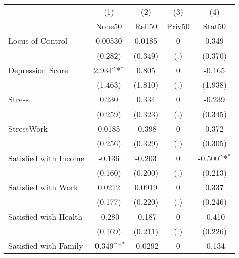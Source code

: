 {
\def\sym#1{\ifmmode^{#1}\else\(^{#1}\)\fi}
\begin{tabular}{l*{4}{c}}
\hline\hline
            &\multicolumn{1}{c}{(1)}&\multicolumn{1}{c}{(2)}&\multicolumn{1}{c}{(3)}&\multicolumn{1}{c}{(4)}\\
            &\multicolumn{1}{c}{None50}&\multicolumn{1}{c}{Reli50}&\multicolumn{1}{c}{Priv50}&\multicolumn{1}{c}{Stat50}\\
\hline
Locus of Control&     0.00530         &      0.0185         &           0         &       0.349         \\
            &     (0.282)         &     (0.349)         &         (.)         &     (0.370)         \\
[1em]
Depression Score&       2.934\sym{*}  &       0.805         &           0         &      -0.165         \\
            &     (1.463)         &     (1.810)         &         (.)         &     (1.938)         \\
[1em]
Stress      &       0.230         &       0.334         &           0         &      -0.239         \\
            &     (0.259)         &     (0.323)         &         (.)         &     (0.345)         \\
[1em]
StressWork  &      0.0185         &      -0.398         &           0         &       0.372         \\
            &     (0.256)         &     (0.329)         &         (.)         &     (0.305)         \\
[1em]
Satisfied with Income&      -0.136         &      -0.203         &           0         &      -0.500\sym{*}  \\
            &     (0.160)         &     (0.200)         &         (.)         &     (0.213)         \\
[1em]
Satisfied with Work&      0.0212         &      0.0919         &           0         &       0.337         \\
            &     (0.177)         &     (0.220)         &         (.)         &     (0.246)         \\
[1em]
Satisfied with Health&      -0.280         &      -0.187         &           0         &      -0.410         \\
            &     (0.169)         &     (0.211)         &         (.)         &     (0.226)         \\
[1em]
Satisfied with Family&      -0.349\sym{*}  &     -0.0292         &           0         &      -0.134         \\

\end{tabular}}
